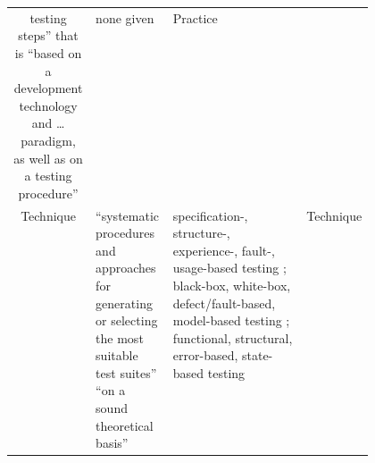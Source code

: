 \begin{table}[hbtp!]
\begin{tabularx}{\linewidth}{|c|X|m{0.37\linewidth}|m{0.1\linewidth}|}
        testing steps'' \cite[p.~2]{BarbosaEtAl2006} that
        is ``based on a development technology and \dots
        paradigm, as well as on a testing procedure''
        \cite[p.~3]{BarbosaEtAl2006}    & none given         & Practice                               \\
        Technique                       & ``systematic
        procedures and approaches for generating or selecting the most suitable test
        suites'' \cite[p.~5-10]{SWEBOK2024} ``on a sound theoretical basis''
        \cite[p.~3]{BarbosaEtAl2006}    & specification-,
        structure-, experience-, fault-, usage-based testing \citep[pp.~5-10, 5-13--5-15]{SWEBOK2024};
        black-box, white-box, defect/fault-based, model-based testing \citep[p.~3]{SouzaEtAl2017};
        functional, structural, error-based, state-based testing
        \cite[p.~3]{BarbosaEtAl2006}
                                        & Technique                                                   \\
        \hline
    \end{tabularx}
\end{table}

